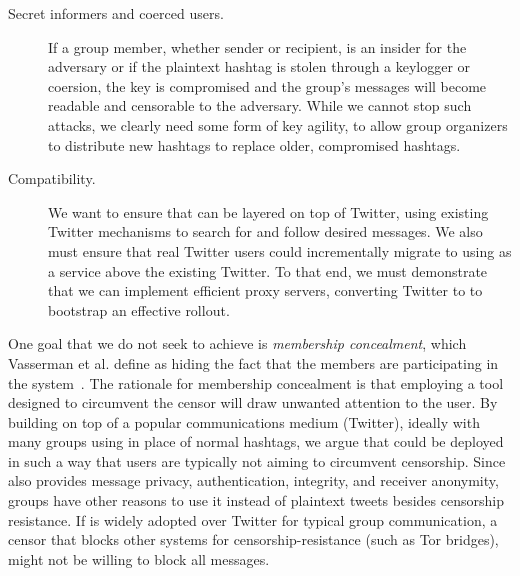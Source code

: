 \begin{description}
\item[Secret informers and coerced users.] If a group member, whether
  sender or recipient, is an insider for the adversary or if the
  plaintext hashtag is stolen through a keylogger or coersion, the key
  is compromised and the group's messages will become readable and
  censorable to the adversary. While we cannot stop such attacks, we
  clearly need some form of key agility, to allow group organizers to
  distribute new hashtags to replace older, compromised hashtags.

\item[Compatibility.] We want to ensure that \hoot can be layered on top
  of Twitter, using existing Twitter mechanisms to search for and follow
  desired messages. We also must ensure that real Twitter users could
  incrementally migrate to using \hoot  as a service above the existing
  Twitter. To that end, we must demonstrate that we can implement
  efficient proxy servers, converting Twitter to \hoot to bootstrap an
  effective \hoot rollout.

\end{description}

One goal that we do not seek to achieve is {\em membership concealment},
which Vasserman et al. define as hiding the fact that the members are
participating in the system~\cite{vasserman09mcon}. The rationale for
membership concealment is that employing a tool designed to circumvent
the censor will draw unwanted attention to the user. By building \hoot
on top of a popular communications medium (Twitter), ideally with many
groups using \hoot in place of normal hashtags, we argue that \hoot
could be deployed in such a way that users are typically not aiming to
circumvent censorship. Since \hoot also provides message privacy,
authentication, integrity, and receiver anonymity, groups have other
reasons to use it instead of plaintext tweets besides censorship
resistance. If \hoot is widely adopted over Twitter for typical group
communication, a censor that blocks other systems for
censorship-resistance (such as Tor bridges), might not be willing to
block all \hoot messages. 

